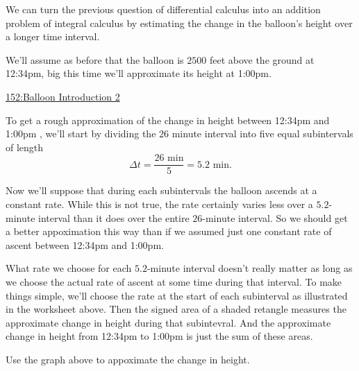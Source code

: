 \documentclass{ximera}
\begin{document}
We can turn the previous question of differential calculus into an addition problem of integral calculus by estimating the change in the balloon's height over a longer time interval.

\begin{example} \label{ExLKDrDEfRE9}

We'll assume as before that the balloon is $2500$ feet above the ground at 12:34pm, big this time we'll approximate its height at 1:00pm.

\begin{onlineOnly}
    \begin{center}
\end{center}
\end{onlineOnly}

\href{https://www.desmos.com/calculator/h6cworakdw}{152:Balloon Introduction 2}

To get a rough approximation of the change in height between 12:34pm and 1:00pm , we'll start by dividing the $26$ minute interval into five equal subintervals of length 
\[
  \Delta t = \frac{26\text{ min}}{5} = 5.2 \text{ min}.
\]
 
Now we'll suppose that during each subintervals the balloon ascends at a constant rate. While this is not true, the rate certainly varies less over a $5.2$-minute interval than it does over the entire $26$-minute interval. So we should get a better appoximation this way than if we assumed just one constant rate of ascent between 12:34pm and 1:00pm.

What rate we choose for each $5.2$-minute interval doesn't really matter as long as we choose the actual rate of ascent at some time during that interval. To make things simple, we'll choose the rate at the start of each subinterval as illustrated in the worksheet above. Then the signed area of a shaded retangle measures the approximate change in height during that subintevral. And the approximate change in height from 12:34pm to 1:00pm is just the sum of these areas.

Use the graph above to appoximate the change in height.
\begin{freeResponse}
\end{freeResponse}



\end{example} 
\end{document}

